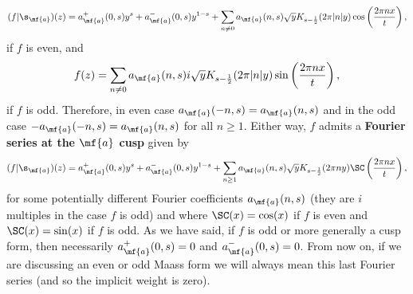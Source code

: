     \[
      (f|\s_{\mf{a}})(z) = a_{\mf{a}}^{+}(0,s)y^{s}+a_{\mf{a}}^{-}(0,s)y^{1-s}+\sum_{n \neq 0}a_{\mf{a}}(n,s)\sqrt{y}K_{s-\frac{1}{2}}(2\pi|n|y)\cos\left(\frac{2\pi nx}{t}\right),
    \]
    if $f$ is even, and
    \[
      f(z) = \sum_{n \neq 0}a_{\mf{a}}(n,s)i\sqrt{y}K_{s-\frac{1}{2}}(2\pi|n|y)\sin\left(\frac{2\pi nx}{t}\right),
    \]
    if $f$ is odd. Therefore, in even case $a_{\mf{a}}(-n,s) = a_{\mf{a}}(n,s)$ and in the odd case $-a_{\mf{a}}(-n,s) = a_{\mf{a}}(n,s)$ for all $n \ge 1$. Either way, $f$ admits a \textbf{Fourier series at the $\mf{a}$ cusp} given by
    \[
      (f|\s_{\mf{a}})(z) = a_{\mf{a}}^{+}(0,s)y^{s}+a_{\mf{a}}^{-}(0,s)y^{1-s}+\sum_{n \ge 1}a_{\mf{a}}(n,s)\sqrt{y}K_{s-\frac{1}{2}}(2\pi ny)\SC\left(\frac{2\pi nx}{t}\right),
    \]
    for some potentially different Fourier coefficients $a_{\mf{a}}(n,s)$ (they are $i$ multiples in the case $f$ is odd) and where $\SC(x) = \cos(x)$ if $f$ is even and $\SC(x) = \sin(x)$ if $f$ is odd. As we have said, if $f$ is odd or more generally a cusp form, then necessarily $a_{\mf{a}}^{+}(0,s) = 0$ and $a_{\mf{a}}^{-}(0,s) = 0$. From now on, if we are discussing an even or odd Maass form we will always mean this last Fourier series (and so the implicit weight is zero).
